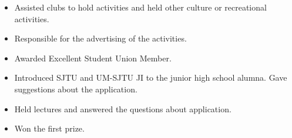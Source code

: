 
\JI
{}
\begin{itemize}
    \item 
    Assisted clubs to hold activities and held other culture or recreational activities.
    \item 
    Responsible for the advertising of the activities.
    \item 
    Awarded Excellent Student Union Member.
\end{itemize}

\begin{itemize}
    \item 
    Introduced SJTU and UM-SJTU JI to the junior high school alumna.  Gave suggestions about the application.
    \item 
    Held lectures and answered the questions about application.
    \item 
    Won the first prize.
\end{itemize}